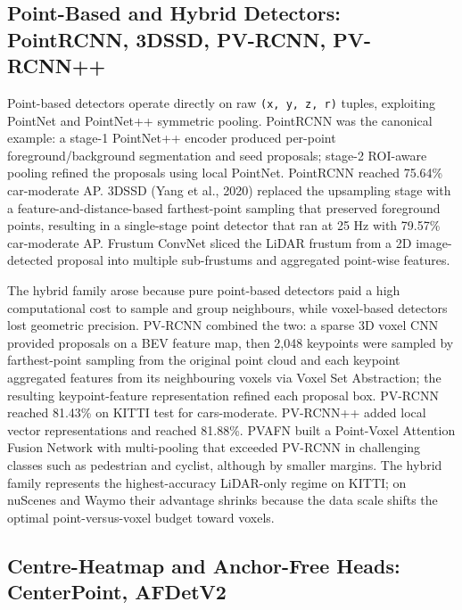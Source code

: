 \documentclass{article}
\begin{document}
\subsection{Point-Based and Hybrid Detectors: PointRCNN, 3DSSD, PV-RCNN, PV-RCNN++}\label{point-based-and-hybrid-detectors-pointrcnn-3dssd-pv-rcnn-pv-rcnn}

Point-based detectors operate directly on raw \texttt{(x,\ y,\ z,\ r)} tuples, exploiting PointNet \citep{qi2017pointnetdeeplearni} and PointNet++ \citep{qi2017pointnetdeeplearni} symmetric pooling. PointRCNN \citep{shi2019pointrcnn3dobjectp} was the canonical example: a stage-1 PointNet++ encoder produced per-point foreground/background segmentation and seed proposals; stage-2 ROI-aware pooling refined the proposals using local PointNet. PointRCNN reached 75.64\% car-moderate AP. 3DSSD (Yang et al., 2020) replaced the upsampling stage with a feature-and-distance-based farthest-point sampling that preserved foreground points, resulting in a single-stage point detector that ran at 25 Hz with 79.57\% car-moderate AP. Frustum ConvNet \citep{wang2019dynamicgraphcnnfor} sliced the LiDAR frustum from a 2D image-detected proposal into multiple sub-frustums and aggregated point-wise features.

The hybrid family arose because pure point-based detectors paid a high computational cost to sample and group neighbours, while voxel-based detectors lost geometric precision. PV-RCNN \citep{shi2019pointrcnn3dobjectp} combined the two: a sparse 3D voxel CNN provided proposals on a BEV feature map, then 2,048 keypoints were sampled by farthest-point sampling from the original point cloud and each keypoint aggregated features from its neighbouring voxels via Voxel Set Abstraction; the resulting keypoint-feature representation refined each proposal box. PV-RCNN reached 81.43\% on KITTI test for cars-moderate. PV-RCNN++ \citep{shi2022pvrcnnpointvoxelfe} added local vector representations and reached 81.88\%. PVAFN \citep{li2024bevformerlearningb} built a Point-Voxel Attention Fusion Network with multi-pooling that exceeded PV-RCNN in challenging classes such as pedestrian and cyclist, although by smaller margins. The hybrid family represents the highest-accuracy LiDAR-only regime on KITTI; on nuScenes and Waymo their advantage shrinks because the data scale shifts the optimal point-versus-voxel budget toward voxels.

\subsection{Centre-Heatmap and Anchor-Free Heads: CenterPoint, AFDetV2}\label{centre-heatmap-and-anchor-free-heads-centerpoint-afdetv2}
\end{document}
